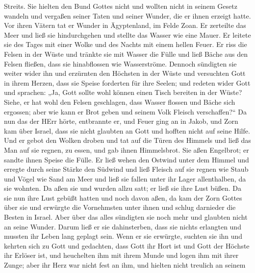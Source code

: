 Streits.  Sie hielten den Bund Gottes nicht und wollten
nicht in seinem Gesetz wandeln  und vergaßen seiner Taten
und seiner Wunder, die er ihnen erzeigt hatte.  Vor ihren
Vätern tat er Wunder in Ägyptenland, im Felde Zoan.  Er
zerteilte das Meer und ließ sie hindurchgehen und stellte das Wasser wie
eine Mauer.  Er leitete sie des Tages mit einer Wolke und
des Nachts mit einem hellen Feuer.  Er riss die Felsen in
der Wüste und tränkte sie mit Wasser die Fülle  und ließ
Bäche aus den Felsen fließen, dass sie hinabflossen wie Wasserströme.
 Dennoch sündigten sie weiter wider ihn und erzürnten den
Höchsten in der Wüste  und versuchten Gott in ihrem Herzen,
dass sie Speise forderten für ihre Seelen;  und redeten
wider Gott und sprachen: „Ja, Gott sollte wohl können einen Tisch
bereiten in der Wüste?  Siehe, er hat wohl den Felsen
geschlagen, dass Wasser flossen und Bäche sich ergossen; aber wie kann
er Brot geben und seinem Volk Fleisch verschaffen?{}``  Da
nun das der HErr hörte, entbrannte er, und Feuer ging an in Jakob, und
Zorn kam über Israel,  dass sie nicht glaubten an Gott und
hofften nicht auf seine Hilfe.  Und er gebot den Wolken
droben und tat auf die Türen des Himmels  und ließ das Man
auf sie regnen, zu essen, und gab ihnen Himmelsbrot.  Sie
aßen Engelbrot; er sandte ihnen Speise die Fülle.  Er ließ
wehen den Ostwind unter dem Himmel und erregte durch seine Stärke den
Südwind  und ließ Fleisch auf sie regnen wie Staub und
Vögel wie Sand am Meer  und ließ sie fallen unter ihr Lager
allenthalben, da sie wohnten.  Da aßen sie und wurden allzu
satt; er ließ sie ihre Lust büßen.  Da sie nun ihre Lust
gebüßt hatten und noch davon aßen,  da kam der Zorn Gottes
über sie und erwürgte die Vornehmsten unter ihnen und schlug darnieder
die Besten in Israel.  Aber über das alles sündigten sie
noch mehr und glaubten nicht an seine Wunder.  Darum ließ
er sie dahinsterben, dass sie nichts erlangten und mussten ihr Leben
lang geplagt sein.  Wenn er sie erwürgte, suchten sie ihn
und kehrten sich zu Gott  und gedachten, dass Gott ihr Hort
ist und Gott der Höchste ihr Erlöser ist,  und heuchelten
ihm mit ihrem Munde und logen ihm mit ihrer Zunge;  aber
ihr Herz war nicht fest an ihm, und hielten nicht treulich an seinem
